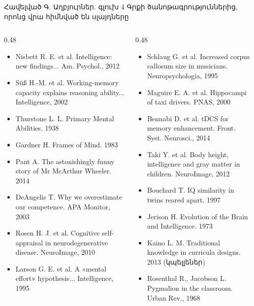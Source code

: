 \begin{frame}{Հավելված Գ. Աղբյուրներ. գլուխ 4}
  \scriptsize
  Գրքի ծանոթագրություններից, որոնց վրա հիմնված են սլայդները\par\smallskip
  \begin{columns}[T]
    \begin{column}{0.48\textwidth}
      \begin{itemize}\setlength{\itemsep}{0.1mm}
        \item Nisbett R. E. et al. Intelligence: new findings... Am. Psychol., 2012
        \item Süß H.-M. et al. Working-memory capacity explains reasoning ability... Intelligence, 2002
        \item Thurstone L. L. Primary Mental Abilities. 1938
        \item Gardner H. Frames of Mind. 1983
        \item Pant A. The astonishingly funny story of Mr McArthur Wheeler. 2014
        \item DeAngelis T. Why we overestimate our competence. APA Monitor, 2003
        \item Rosen H. J. et al. Cognitive self-appraisal in neurodegenerative disease. NeuroImage, 2010
        \item Larson G. E. et al. A «mental effort» hypothesis... Intelligence, 1995
      \end{itemize}
    \end{column}
    \begin{column}{0.48\textwidth}
      \begin{itemize}\setlength{\itemsep}{0.1mm}
        \item Schlaug G. et al. Increased corpus callosum size in musicians. Neuropsychologia, 1995
        \item Maguire E. A. et al. Hippocampi of taxi drivers. PNAS, 2000
        \item Bennabi D. et al. tDCS for memory enhancement. Front. Syst. Neurosci., 2014
        \item Taki Y. et al. Body height, intelligence and gray matter in children. NeuroImage, 2012
        \item Bouchard T. IQ similarity in twins reared apart. 1997
        \item Jerison H. Evolution of the Brain and Intelligence. 1973
        \item Kaino L. M. Traditional knowledge in curricula designs. 2013 (կպելլեներ)
        \item Rosenthal R., Jacobson L. Pygmalion in the classroom. Urban Rev., 1968
      \end{itemize}
    \end{column}
  \end{columns}
\end{frame}
